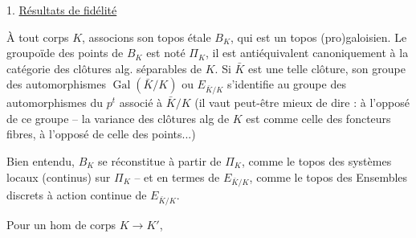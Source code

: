 1. \uline{Résultats de fidélité}

À tout corps $K$, associons son topos étale $B_K$, qui est un topos (pro)galoisien. Le groupoïde des points de $B_K$ est noté $\Pi_K$, il est antiéquivalent canoniquement à la catégorie des clôtures alg. séparables de $K$. Si $\bar K$ est une telle clôture, son groupe des automorphismes $\operatorname{Gal}(\bar K/K)$ ou $E_{\bar K/K}$ s'identifie au groupe des automorphismes du $p^t$  associé à $\bar K/K$ (il vaut peut-être mieux de dire : à l'opposé de ce groupe --  la variance des clôtures alg de $K$ est comme celle des foncteurs fibres, à l'opposé de celle des points...)

Bien entendu, $B_K$ se réconstitue à partir de $\Pi_K$, comme le topos des systèmes locaux (continus) sur $\Pi_K$ -- et en termes de $E_{\bar K/K}$, comme le topos des Ensembles discrets à action continue de $E_{\bar K/K}$.

Pour un hom de corps $K\longrightarrow K'$,
